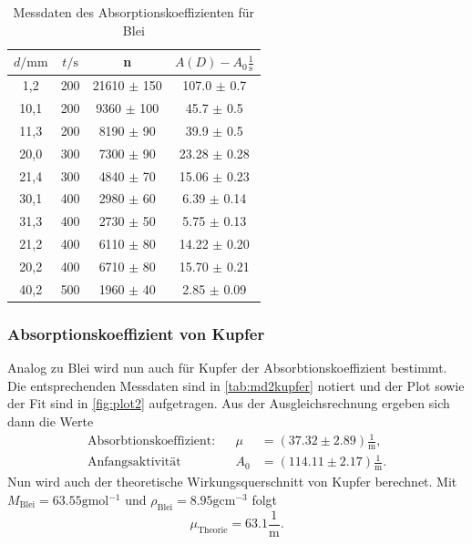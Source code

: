 \begin{table}[H]
    \centering
    \caption{Messdaten des Absorptionskoeffizienten für Blei}
    \label{tab:md1blei}
    \begin{tabular}{c c c c}
        \toprule
        $d / \unit{\milli\meter}$ &  $t / \unit\second$ &     n & $A(D) - A_0 \frac{1}{\unit\second}$\\ 
        \midrule
            1,2 &  200 & 21610 $\pm$ 150 &  107.0 $\pm$ 0.7 \\
           10,1 &  200 &  9360 $\pm$ 100 &   45.7 $\pm$ 0.5 \\
           11,3 &  200 &  8190 $\pm$ 90  &   39.9 $\pm$ 0.5 \\
           20,0 &  300 &  7300 $\pm$ 90  & 23.28  $\pm$ 0.28 \\
           21,4 &  300 &  4840 $\pm$ 70  & 15.06  $\pm$ 0.23 \\
           30,1 &  400 &  2980 $\pm$ 60  &  6.39  $\pm$ 0.14 \\
           31,3 &  400 &  2730 $\pm$ 50  &  5.75  $\pm$ 0.13 \\
           21,2 &  400 &  6110 $\pm$ 80  & 14.22  $\pm$ 0.20 \\
           20,2 &  400 &  6710 $\pm$ 80  & 15.70  $\pm$ 0.21 \\
           40,2 &  500 &  1960 $\pm$ 40  &  2.85  $\pm$ 0.09 \\
        \bottomrule
    \end{tabular}
\end{table}

\subsubsection*{Absorptionskoeffizient von Kupfer}

Analog zu Blei wird nun auch für Kupfer der Absorbtionskoeffizient bestimmt.
Die entsprechenden Messdaten sind in \autoref{tab:md2kupfer} notiert und der Plot sowie der Fit sind in \autoref{fig:plot2} aufgetragen.
Aus der Ausgleichsrechnung ergeben sich dann die Werte
\begin{align*}
    \text{Absorbtionskoeffizient:} && \mu &= (37.32 \pm 2.89) \frac{1}{\unit\meter},\\
    \text{Anfangsaktivität} && A_0 &= (114.11 \pm 2.17) \frac{1}{\unit\meter}.
\end{align*} 
Nun wird auch der theoretische Wirkungsquerschnitt von Kupfer berechnet.
Mit $M_\text{Blei} = 63.55 \unit{\gram\mol^{-1}}$ \cite{molaremasse} und $ \rho_\text{Blei} = 8.95 \unit{\gram\centi\meter^{-3}}$ folgt
\begin{equation}
    \mu_\text{Theorie} = 63.1 \frac{1}{\unit\meter}.
\end{equation}


